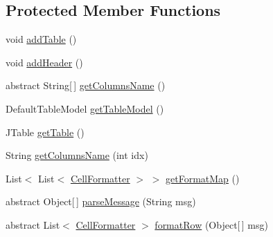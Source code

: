 \subsection*{Protected Member Functions}
\begin{DoxyCompactItemize}
\item 
void \hyperlink{classit_1_1emarolab_1_1cagg_1_1debugging_1_1baseComponents_1_1LoggingTable_a6da67f791ae8ea222c39b7e6bc8be5fc}{add\-Table} ()
\item 
void \hyperlink{classit_1_1emarolab_1_1cagg_1_1debugging_1_1baseComponents_1_1LoggingTable_aaeaa64104f26abcdfd7f2113e228b753}{add\-Header} ()
\item 
abstract String\mbox{[}$\,$\mbox{]} \hyperlink{classit_1_1emarolab_1_1cagg_1_1debugging_1_1baseComponents_1_1LoggingTable_a3c8bea8ac83308e93d5400d199966ca0}{get\-Columns\-Name} ()
\item 
Default\-Table\-Model \hyperlink{classit_1_1emarolab_1_1cagg_1_1debugging_1_1baseComponents_1_1LoggingTable_aeb5b37e3da7fd6d5d73213c738fc6786}{get\-Table\-Model} ()
\item 
J\-Table \hyperlink{classit_1_1emarolab_1_1cagg_1_1debugging_1_1baseComponents_1_1LoggingTable_a456a505577e8ded1cfea7ba5fe020bc7}{get\-Table} ()
\item 
String \hyperlink{classit_1_1emarolab_1_1cagg_1_1debugging_1_1baseComponents_1_1LoggingTable_aaa8b4cf2430fa29880d255ad1e6181ba}{get\-Columns\-Name} (int idx)
\item 
List$<$ List$<$ \hyperlink{classit_1_1emarolab_1_1cagg_1_1debugging_1_1baseComponents_1_1LoggingTable_1_1CellFormatter}{Cell\-Formatter} $>$ $>$ \hyperlink{classit_1_1emarolab_1_1cagg_1_1debugging_1_1baseComponents_1_1LoggingTable_adebfe4488ae1d18de55308fb5a173087}{get\-Format\-Map} ()
\item 
abstract Object\mbox{[}$\,$\mbox{]} \hyperlink{classit_1_1emarolab_1_1cagg_1_1debugging_1_1baseComponents_1_1LoggingTable_ab5b88a754b874c389ce6a7ae21595414}{parse\-Message} (String msg)
\item 
abstract List$<$ \hyperlink{classit_1_1emarolab_1_1cagg_1_1debugging_1_1baseComponents_1_1LoggingTable_1_1CellFormatter}{Cell\-Formatter} $>$ \hyperlink{classit_1_1emarolab_1_1cagg_1_1debugging_1_1baseComponents_1_1LoggingTable_aa31239f7ea9a29b863eac00c3546c2fb}{format\-Row} (Object\mbox{[}$\,$\mbox{]} msg)
\end{DoxyCompactItemize}

